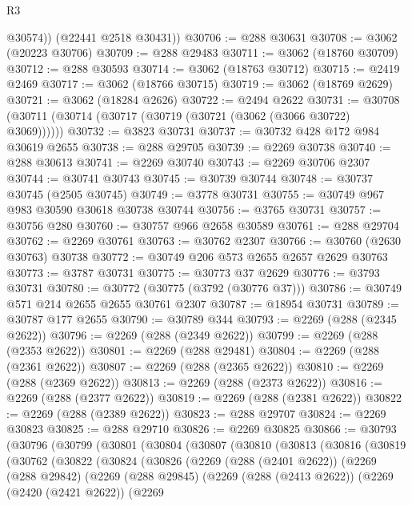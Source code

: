 \begin{lexlean}{R3}
\begin{coremodule}
          @30574))
      (@22441 @2518 @30431))
@30706 := @288 @30631
@30708 := @3062 (@20223 @30706)
@30709 := @288 @29483
@30711 := @3062 (@18760 @30709)
@30712 := @288 @30593
@30714 := @3062 (@18763 @30712)
@30715 := @2419 @2469
@30717 := @3062 (@18766 @30715)
@30719 := @3062 (@18769 @2629)
@30721 := @3062 (@18284 @2626)
@30722 := @2494 @2622
@30731 := @30708 (@30711 (@30714 (@30717 (@30719 (@30721 (@3062 (@3066 @30722) @3069))))))
@30732 := @3823 @30731
@30737 := @30732 @428 @172 @984 @30619 @2655
@30738 := @288 @29705
@30739 := @2269 @30738
@30740 := @288 @30613
@30741 := @2269 @30740
@30743 := @2269 @30706 @2307
@30744 := @30741 @30743
@30745 := @30739 @30744
@30748 := @30737 @30745 (@2505 @30745)
@30749 := @3778 @30731
@30755 := @30749 @967 @983 @30590 @30618 @30738 @30744
@30756 := @3765 @30731
@30757 := @30756 @280
@30760 := @30757 @966 @2658 @30589
@30761 := @288 @29704
@30762 := @2269 @30761
@30763 := @30762 @2307
@30766 := @30760 (@2630 @30763) @30738
@30772 := @30749 @206 @573 @2655 @2657 @2629 @30763
@30773 := @3787 @30731
@30775 := @30773 @37 @2629
@30776 := @3793 @30731
@30780 := @30772 (@30775 (@3792 (@30776 @37)))
@30786 := @30749 @571 @214 @2655 @2655 @30761 @2307
@30787 := @18954 @30731
@30789 := @30787 @177 @2655
@30790 := @30789 @344
@30793 := @2269 (@288 (@2345 @2622))
@30796 := @2269 (@288 (@2349 @2622))
@30799 := @2269 (@288 (@2353 @2622))
@30801 := @2269 (@288 @29481)
@30804 := @2269 (@288 (@2361 @2622))
@30807 := @2269 (@288 (@2365 @2622))
@30810 := @2269 (@288 (@2369 @2622))
@30813 := @2269 (@288 (@2373 @2622))
@30816 := @2269 (@288 (@2377 @2622))
@30819 := @2269 (@288 (@2381 @2622))
@30822 := @2269 (@288 (@2389 @2622))
@30823 := @288 @29707
@30824 := @2269 @30823
@30825 := @288 @29710
@30826 := @2269 @30825
@30866 := @30793
    (@30796
      (@30799
        (@30801
          (@30804
            (@30807
              (@30810
                (@30813
                  (@30816
                    (@30819
                      (@30762
                        (@30822
                          (@30824
                            (@30826
                              (@2269
                                (@288 (@2401 @2622))
                                (@2269
                                  (@288 @29842)
                                  (@2269
                                    (@288 @29845)
                                    (@2269
                                      (@288 (@2413 @2622))
                                      (@2269
                                        (@2420 (@2421 @2622))
                                        (@2269

\end{coremodule}
\end{lexlean}
